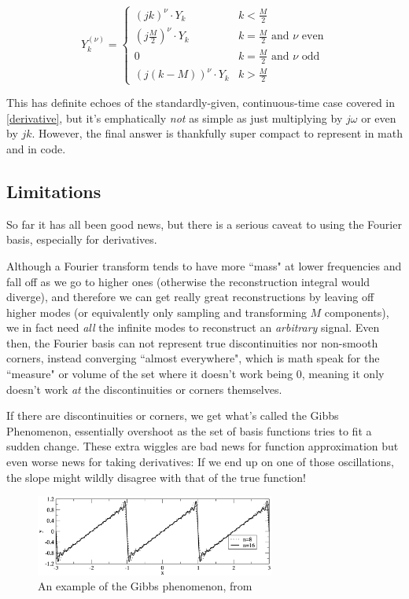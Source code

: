 \documentclass[10pt]{article}
\begin{document}
\begin{equation}\label{Y_nu}
Y^{(\nu)}_k = \begin{cases} (j k)^\nu \cdot Y_k & k < \frac{M}{2} \\ (j \frac{M}{2})^\nu \cdot Y_k & k = \frac{M}{2} \text{ and } \nu \text{ even} \\ 0 & k = \frac{M}{2} \text{ and } \nu \text{ odd} \\ (j(k - M))^\nu \cdot Y_k & k > \frac{M}{2} \end{cases}
\end{equation}

This has definite echoes of the standardly-given, continuous-time case covered in \autoref{derivative}, but it's emphatically \textit{not} as simple as just multiplying by $j\omega$ or even by $j k$. However, the final answer is thankfully super compact to represent in math and in code.

\subsection{Limitations}\label{artefacts}

So far it has all been good news, but there is a serious caveat to using the Fourier basis, especially for derivatives.

Although a Fourier transform tends to have more ``mass" at lower frequencies and fall off as we go to higher ones (otherwise the reconstruction integral would diverge), and therefore we can get really great reconstructions by leaving off higher modes\cite{kutz} (or equivalently only sampling and transforming $M$ components), we in fact need \textit{all} the infinite modes to reconstruct an \textit{arbitrary} signal\cite{oppenheim}. Even then, the Fourier basis can not represent true discontinuities nor non-smooth corners, instead converging ``almost everywhere", which is math speak for the ``measure" or volume of the set where it doesn't work being 0, meaning it only doesn't work \textit{at} the discontinuities or corners themselves.\cite{oppenheim}

If there are discontinuities or corners, we get what's called the Gibbs Phenomenon\cite{oppenheim}, essentially overshoot as the set of basis functions tries to fit a sudden change. These extra wiggles are bad news for function approximation but even worse news for taking derivatives: If we end up on one of those oscillations, the slope might wildly disagree with that of the true function!

\begin{figure}[h!]
	\centering
	\includegraphics[width=0.7\textwidth]{gibbs.png}
	\caption*{An example of the Gibbs phenomenon, from \cite{kutz}}
\end{figure}
\end{document}
